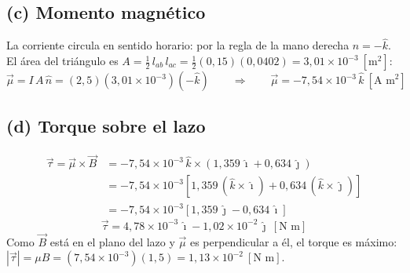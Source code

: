 \documentclass[12pt,letterpaper]{article}
\begin{document}
\subsection*{(c) Momento magn\'etico}

La corriente circula en sentido horario: por la regla de la mano derecha $\hat{n} = -\hat{k}$. El
\'area del tri\'angulo es $A = \tfrac12\,l_{ab}\,l_{ac} = \tfrac12(0{,}15)(0{,}0402) = 3{,}01\times10^{-3}\ [\text{m}^2]$:
\[
    \vec{\mu} = I\,A\,\hat{n} = (2{,}5)(3{,}01\times10^{-3})(-\hat{k})
    \qquad\Rightarrow\qquad
    \boxed{\vec{\mu} = -7{,}54\times10^{-3}\,\hat{k}\ [\text{A m}^2]}
\]

\subsection*{(d) Torque sobre el lazo}

\begin{align*}
    \vec{\tau} = \vec{\mu}\times\vec{B}
      &= -7{,}54\times10^{-3}\,\hat{k}\times\left(1{,}359\,\hat{\imath} + 0{,}634\,\hat{\jmath}\right)\\[2pt]
      &= -7{,}54\times10^{-3}\left[1{,}359\,(\hat{k}\times\hat{\imath}) + 0{,}634\,(\hat{k}\times\hat{\jmath})\right]\\[2pt]
      &= -7{,}54\times10^{-3}\left[1{,}359\,\hat{\jmath} - 0{,}634\,\hat{\imath}\right]
\end{align*}
\[
    \boxed{\vec{\tau} = 4{,}78\times10^{-3}\,\hat{\imath} - 1{,}02\times10^{-2}\,\hat{\jmath}\ [\text{N m}]}
\]
Como $\vec{B}$ est\'a en el plano del lazo y $\vec{\mu}$ es perpendicular a \'el, el torque es m\'aximo:
$|\vec{\tau}| = \mu B = (7{,}54\times10^{-3})(1{,}5) = 1{,}13\times10^{-2}\ [\text{N m}]$.
\end{document}

